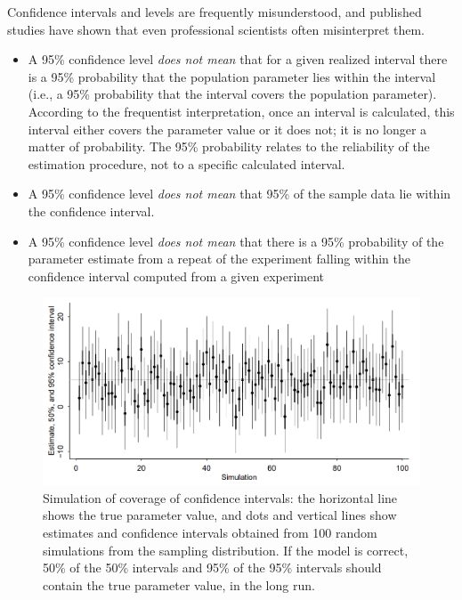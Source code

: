 \documentclass[11pt,a4paper]{article}
\begin{document}
Confidence intervals and levels are frequently misunderstood, 
and published studies have shown that even professional scientists often misinterpret them.
\begin{itemize}
\item A 95\% confidence level \emph{does not mean} that for a given realized interval there is a 95\% probability 
that the population parameter lies within the interval (i.e., a 95\% probability that the interval covers the population parameter).
According to the frequentist interpretation, 
once an interval is calculated, 
this interval either covers the parameter value or it does not; 
it is no longer a matter of probability. 
The 95\% probability relates to the reliability of the estimation procedure, 
not to a specific calculated interval.
\item A 95\% confidence level \emph{does not mean} that 95\% of the sample data lie within the confidence interval.
\item A 95\% confidence level \emph{does not mean} that there is a 95\% probability of the parameter 
estimate from a repeat of the experiment falling within the confidence interval computed from a given experiment
\end{itemize}

\begin{figure}[h!]
\centering
\includegraphics[width=0.75\linewidth]{images/figure1.png}
\caption{%
Simulation of coverage of confidence intervals: the horizontal line shows the true parameter value,
and dots and vertical lines show estimates and confidence intervals obtained from 100 random simulations from
the sampling distribution. 
If the model is correct, 50\% of the 50\% intervals and 95\% of the 95\% intervals should
contain the true parameter value, in the long run.}
\label{fig:interval}
\end{figure}
\end{document}
